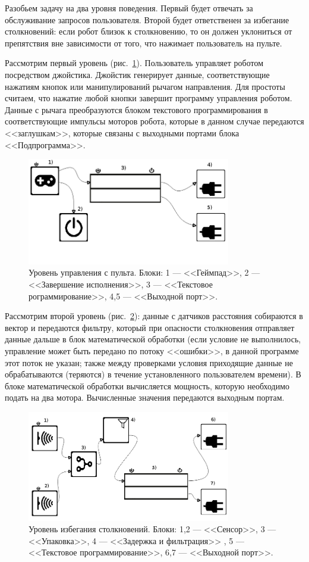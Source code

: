 \documentclass[conference]{IEEEtran}
\begin{document}
Разобьем задачу на два уровня поведения. Первый будет отвечать за обслуживание запросов пользователя. Второй будет ответственен за избегание столкновений: если робот близок к столкновению, то он должен уклониться от препятствия вне зависимости от того, что нажимает пользователь на пульте. 

Рассмотрим первый уровень (рис.~\ref{image:layer1}). Пользователь управляет роботом посредством джойстика. Джойстик генерирует данные, соответствующие нажатиям кнопок или манипулирований рычагом направления. Для простоты считаем, что нажатие любой кнопки завершит программу управления роботом. Данные с рычага преобразуются блоком текстового программирования в соответствующие импульсы моторов робота, которые в данном случае передаются <<заглушкам>>, которые связаны с выходными портами блока <<Подпрограмма>>. 
\begin{figure}[ht]
	\centering
	\includegraphics[width=3.5in]{pultLayer.png}
	\caption{Уровень управления с пульта. Блоки: 1 --- <<Геймпад>>, 2 --- <<Завершение исполнения>>, 3 --- <<Текстовое рограммирование>>, 4,5 --- <<Выходной порт>>.}
	\label{image:layer1}
\end{figure}

Рассмотрим второй уровень (рис.~\ref{image:layer2}): данные с датчиков расстояния собираются в вектор и передаются фильтру, который при опасности столкновения отправляет данные дальше в блок математической обработки (если условие не выполнилось, управление может быть передано по потоку <<ошибки>>, в данной программе этот поток не указан; также между проверками условия приходящие данные не обрабатываются (теряются) в течение установленного пользователем времени). В блоке математической обработки вычисляется мощность, которую необходимо подать на два мотора. Вычисленные значения передаются выходным портам.
\begin{figure}[ht]
	\centering
	\includegraphics[width=3.5in]{collisionLayer.png}
	\caption{Уровень избегания столкновений. Блоки: 1,2 --- <<Сенсор>>, 3 --- <<Упаковка>>, 4 --- <<Задержка и фильтрация>> , 5 --- <<Текстовое программирование>>, 6,7 --- <<Выходной порт>>.}
	\label{image:layer2}
\end{figure}
\end{document}
